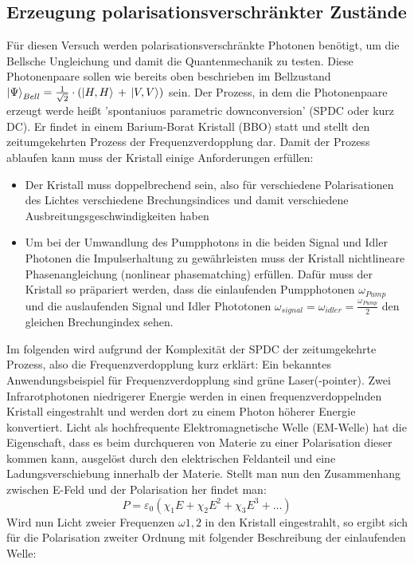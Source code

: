 \documentclass[twoside,colorback,accentcolor=tud4c,11pt]{tudreport}
\begin{document}
\subsection{Erzeugung polarisationsverschränkter Zustände}
Für diesen Versuch werden polarisationsverschränkte Photonen benötigt, um die Bellsche Ungleichung und damit die Quantenmechanik zu testen. Diese Photonenpaare sollen wie bereits oben beschrieben im Bellzustand $\Ket{\Psi}_{Bell}=\frac{1}{\sqrt{2}}\cdot\left(\Ket{H,H}\,+\,\Ket{V,V}\right)$ sein. Der Prozess, in dem die Photonenpaare erzeugt werde heißt 'spontaniuos parametric downconversion' (SPDC oder kurz DC). Er findet in einem Barium-Borat Kristall (BBO) statt und stellt den zeitumgekehrten Prozess der Frequenzverdopplung dar.
Damit der Prozess ablaufen kann muss der Kristall einige Anforderungen erfüllen:
\begin{itemize}
\item Der Kristall muss doppelbrechend sein, also für verschiedene Polarisationen des Lichtes verschiedene Brechungsindices und damit verschiedene Ausbreitungsgeschwindigkeiten haben
\item Um bei der Umwandlung des Pumpphotons in die beiden Signal und Idler Photonen die Impulserhaltung zu gewährleisten muss der Kristall nichtlineare Phasenangleichung (nonlinear phasematching) erfüllen. Dafür muss der Kristall so präpariert werden, dass die einlaufenden Pumpphotonen $\omega_{Pump}$ und die auslaufenden Signal und Idler Phototonen $\omega_{signal}=\omega_{idler}=\frac{\omega_{Pump}}{2}$ den gleichen Brechungindex sehen.
\end{itemize}
Im folgenden wird aufgrund der Komplexität der SPDC der zeitumgekehrte Prozess, also die Frequenzverdopplung kurz erklärt:
Ein bekanntes Anwendungsbeispiel für Frequenzverdopplung sind grüne Laser(-pointer). Zwei Infrarotphotonen niedrigerer Energie werden in einen frequenzverdoppelnden Kristall eingestrahlt und werden dort zu einem Photon höherer Energie konvertiert.
Licht als hochfrequente Elektromagnetische Welle (EM-Welle) hat die Eigenschaft, dass es beim durchqueren von Materie zu einer Polarisation dieser kommen kann, ausgelöst durch den elektrischen Feldanteil und eine Ladungsverschiebung innerhalb der Materie. Stellt man nun den Zusammenhang zwischen E-Feld und der Polarisation her findet man:
\begin{equation}
P=\varepsilon_{0}\left(\chi_{1}E+\chi_{2}E^{2}+\chi_{3}E^{3}+...\right)
\end{equation}
Wird nun Licht zweier Frequenzen $\omega{1,2}$ in den Kristall eingestrahlt, so ergibt sich für die Polarisation zweiter Ordnung mit folgender Beschreibung der einlaufenden Welle:
\end{document}
